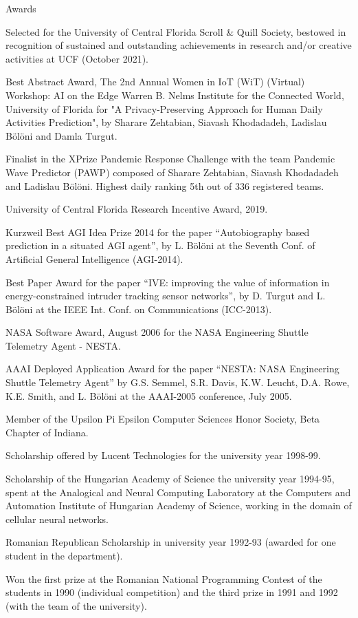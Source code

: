 \documentclass{resume}
\begin{document}
\begin{category}{Awards}

\citembullet Selected for the University of Central Florida Scroll \& Quill Society, bestowed in recognition of sustained and outstanding achievements in research and/or creative activities at UCF (October 2021).

\citembullet Best Abstract Award, The 2nd Annual Women in IoT (WiT) (Virtual) Workshop: AI on the Edge Warren B. Nelms Institute for the Connected World, University of Florida for "A Privacy-Preserving Approach for Human Daily Activities Prediction", by Sharare Zehtabian, Siavash Khodadadeh, Ladislau Bölöni and Damla Turgut. 

\citembullet Finalist in the XPrize Pandemic Response Challenge with the team
Pandemic Wave Predictor (PAWP) composed of Sharare Zehtabian, Siavash Khodadadeh and Ladislau Bölöni. Highest daily ranking 5th out of 336 registered teams.

\citembullet University of Central Florida Research Incentive Award, 2019.

\citembullet Kurzweil Best AGI Idea Prize 2014 for the paper ``Autobiography based prediction in a situated AGI agent'', by L. Bölöni at the Seventh Conf. of Artificial General Intelligence (AGI-2014).

\citembullet Best Paper Award for the paper ``IVE: improving the value of information in energy-constrained intruder tracking sensor networks'', by D. Turgut and L. Bölöni at the IEEE Int. Conf. on Communications (ICC-2013).

\citembullet NASA Software Award, August 2006 for the NASA Engineering Shuttle Telemetry Agent - NESTA.

\citembullet AAAI Deployed Application Award for the paper ``NESTA: NASA Engineering Shuttle Telemetry Agent'' by G.S. Semmel, S.R. Davis, K.W. Leucht, D.A. Rowe, K.E. Smith, and L. Bölöni at the AAAI-2005 conference, July 2005.

\citembullet Member of the Upsilon Pi Epsilon Computer Sciences Honor Society, Beta Chapter of Indiana.

\citembullet Scholarship offered by Lucent Technologies for the university year 1998-99.

\citembullet Scholarship of the Hungarian Academy of Science the university year 1994-95, spent at the Analogical and Neural Computing Laboratory at the Computers and Automation Institute of Hungarian Academy of Science, working in the domain of cellular neural networks.

\citembullet Romanian Republican Scholarship in university year 1992-93 (awarded for one student in the department).

\citembullet Won the first prize at the Romanian National Programming Contest of the students in 1990 (individual competition) and the third prize in  1991 and 1992 (with the team of the university).

\end{category}
\end{document}
